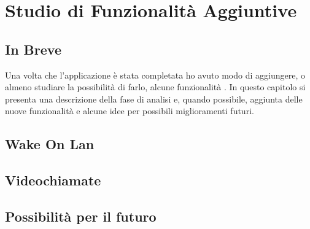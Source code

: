 \chapter{Studio di Funzionalità Aggiuntive}

\section{In Breve}
Una volta che l'applicazione è stata completata  ho avuto modo di aggiungere, o almeno studiare la possibilità di farlo, alcune funzionalità .
In questo capitolo si presenta una descrizione della fase di analisi e, quando possibile, aggiunta delle nuove funzionalità e alcune idee per possibili miglioramenti futuri.

\section{Wake On Lan}
\section{Videochiamate}
\section{Possibilità per il futuro}